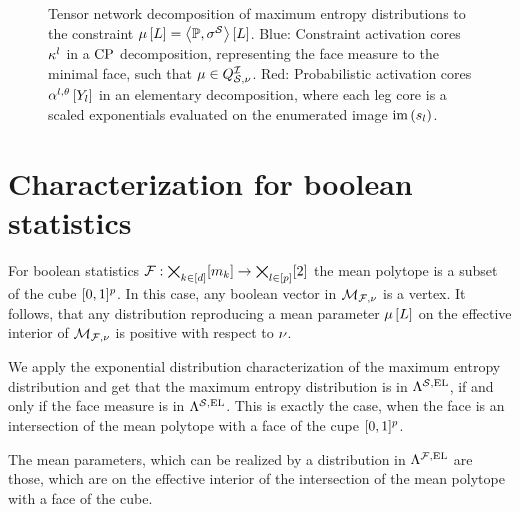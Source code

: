 \documentclass[aps,onecolumn,nofootinbib,pra]{article}
\begin{document}
    \begin{figure}[t]
        \begin{center}
            
        \end{center}
        \caption{
            Tensor network decomposition of maximum entropy distributions to the constraint $\mu\left[L\right]=\left\langle \mathbb{P},\sigma^{\mathcal{S}}\right\rangle \left[ L \right]$.
            Blue: Constraint activation cores $\kappa^{l}$ in a $\mathrm{CP}$ decomposition, representing the face measure to the minimal face, such that $\mu\in Q^{\mathcal{I}}_{\mathcal{S},\nu}$.
            Red: Probabilistic activation cores $\alpha^{l,\theta}\left[Y_{l}\right]$ in an elementary decomposition, where each leg core is a scaled exponentials evaluated on the enumerated image $\mathrm{im}\left(s_{l}\right)$.
        }\label{fig:maxEntropyActcore}
    \end{figure}


    \section{Characterization for boolean statistics}

    For boolean statistics $\mathcal{F}:\bigtimes_{k\in[d]}[m_{k}]\rightarrow\bigtimes_{l\in[p]}[2]$ the mean polytope is a subset of the cube $[0,1]^p$.
    In this case, any boolean vector in $\mathcal{M}_{\mathcal{F},\nu}$ is a vertex.
    It follows, that any distribution reproducing a mean parameter $\mu\left[L\right]$ on the effective interior of $\mathcal{M}_{\mathcal{F},\nu}$ is positive with respect to $\nu$.

    We apply the exponential distribution characterization of the maximum entropy distribution and get that the maximum entropy distribution is in $\Lambda^{\mathcal{S},\mathrm{EL}}$, if and only if the face measure is in $\Lambda^{\mathcal{S},\mathrm{EL}}$.
    This is exactly the case, when the face is an intersection of the mean polytope with a face of the cupe $[0,1]^p$.

    The mean parameters, which can be realized by a distribution in $\Lambda^{\mathcal{F},\mathrm{EL}}$ are those, which are on the effective interior of the intersection of the mean polytope with a face of the cube.
\end{document}
